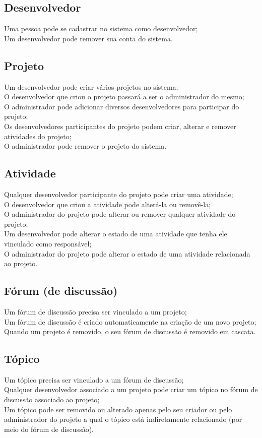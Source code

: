 \documentclass{article}
\begin{document}
	\subsection{Desenvolvedor}
	Uma pessoa pode se cadastrar no sistema como desenvolvedor;\\
	Um desenvolvedor pode remover sua conta do sistema.

	\subsection{Projeto}
	Um desenvolvedor pode criar vários projetos no sistema;\\
	O desenvolvedor que criou o projeto passará a ser o administrador do mesmo;\\
	O administrador pode adicionar diversos desenvolvedores para participar do projeto;\\
	Os desenvolvedores participantes do projeto podem criar, alterar e remover atividades do projeto;\\
	O administrador pode remover o projeto do sistema.

	\subsection{Atividade}
	Qualquer desenvolvedor participante do projeto pode criar uma atividade;\\
	O desenvolvedor que criou a atividade pode alterá-la ou removê-la;\\
	O administrador do projeto pode alterar ou remover qualquer atividade do projeto;\\
	Um desenvolvedor pode alterar o estado de uma atividade que tenha ele vinculado como responsável;\\
	O administrador do projeto pode alterar o estado de uma atividade relacionada ao projeto.

	\subsection{Fórum (de discussão)}
	Um fórum de discussão precisa ser vinculado a um projeto;\\
	Um fórum de discussão é criado automaticamente na criação de um novo projeto;\\
	Quando um projeto é removido, o seu fórum de discussão é removido em cascata.

	\subsection{Tópico}
	Um tópico precisa ser vinculado a um fórum de discussão;\\
	Qualquer desenvolvedor associado a um projeto pode criar um tópico no fórum de discussão associado ao projeto;\\
	Um tópico pode ser removido ou alterado apenas pelo seu criador ou pelo administrador do projeto a qual o tópico está indiretamente relacionado (por meio do fórum de discussão).
\end{document}
